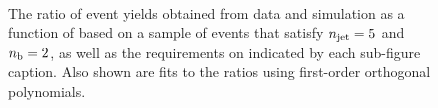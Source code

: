 \begin{figure}[h!]
\begin{center}
    \\
    \caption{The ratio of event yields obtained from data and simulation as a function of \mht [GeV] based on a sample of \mj events that satisfy $n_{\text{jet}} = 5$ and $n_{\text{b}} = 2$, as well as the requirements on \scalht indicated by each sub-figure caption. Also shown are fits to the ratios using first-order orthogonal polynomials.}
    \label{fig:mhtval_Mu_eq5j_eq2b}
  \end{center}
\end{figure}

